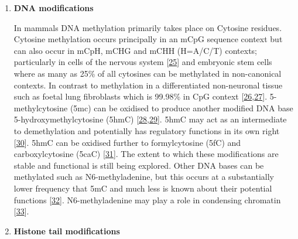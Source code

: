\documentclass[
]{book}
\begin{document}
\begin{enumerate}
\def\labelenumi{\arabic{enumi}.}
\item
  \textbf{DNA modifications}

  In mammals DNA methylation primarily takes place on Cytosine residues.
  Cytosine methylation occurs principally in an mCpG sequence context but can also occur in mCpH, mCHG and mCHH (H=A/C/T) contexts; particularly in cells of the nervous system {[}\protect\hyperlink{ref-Guo2014a}{25}{]} and embryonic stem cells where as many as 25\% of all cytosines can be methylated in non-canonical contexts.
  In contrast to methylation in a differentiated non-neuronal tissue such as foetal lung fibroblasts which is 99.98\% in CpG context {[}\protect\hyperlink{ref-Lister2009}{26},\protect\hyperlink{ref-Schultz2015}{27}{]}.
  5-methylcytosine (5mc) can be oxidised to produce another modified DNA base 5-hydroxymethylcytosine (5hmC) {[}\protect\hyperlink{ref-Penn1972}{28},\protect\hyperlink{ref-Kriaucionis2009}{29}{]}.
  5hmC may act as an intermediate to demethylation and potentially has regulatory functions in its own right {[}\protect\hyperlink{ref-Pfeifer2013}{30}{]}.
  5hmC can be oxidised further to formylcytosine (5fC) and carboxylcytosine (5caC) {[}\protect\hyperlink{ref-Ito2011}{31}{]}.
  The extent to which these modifications are stable and functional is still being explored.
  Other DNA bases can be methylated such as N6-methyladenine, but this occurs at a substantially lower frequency that 5mC and much less is known about their potential functions {[}\protect\hyperlink{ref-Wu2016}{32}{]}.
  N6-methyladenine may play a role in condensing chromatin {[}\protect\hyperlink{ref-Xie2018}{33}{]}.
\item
  \textbf{Histone tail modifications}


\end{enumerate}
\end{document}

